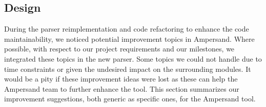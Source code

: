
\subsection{Design}
\label{recommendations:design}
During the parser reimplementation and code refactoring to enhance the code maintainability, we noticed potential improvement topics in Ampersand.
Where possible, with respect to our project requirements and our milestones, we integrated these topics in the new parser.
Some topics we could not handle due to time constraints or given the undesired impact on the surrounding modules.
It would be a pity if these improvement ideas were lost as these can help the Ampersand team to further enhance the tool.
This section summarizes our improvement suggestions, both generic as specific ones, for the Ampersand tool.

